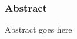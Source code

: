 \newpage
\thispagestyle{headings}
\mbox{}

\newpage
\thispagestyle{headings}
\mbox{}

\begin{center} \subsubsection*{Abstract} \end{center}
Abstract goes here
